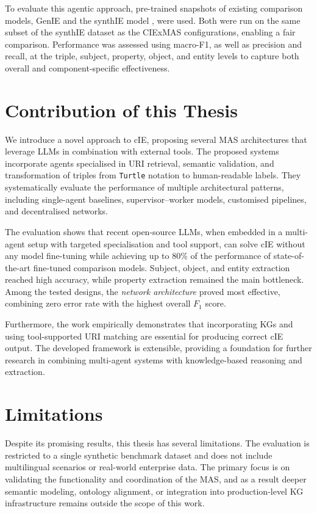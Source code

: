 \documentclass[a4paper,oneside,bibliography=totoc]{scrbook}
\begin{document}
To evaluate this agentic approach, pre-trained snapshots of existing comparison models, GenIE \cite{Josifoski2021} and the synthIE model \cite{Josifoski2023}, were used. Both were run on the same subset of the synthIE dataset as the CIExMAS configurations, enabling a fair comparison. Performance was assessed using macro-F1, as well as precision and recall, at the triple, subject, property, object, and entity levels to capture both overall and component-specific effectiveness.

\section{Contribution of this Thesis}
\label{sec:contribution}

We introduce a novel approach to \ac{cIE}, proposing several \ac{MAS} architectures that leverage \acp{LLM} in combination with external tools. The proposed systems incorporate agents specialised in \ac{URI} retrieval, semantic validation, and transformation of triples from \texttt{Turtle} notation to human-readable labels. They systematically evaluate the performance of multiple architectural patterns, including single-agent baselines, supervisor–worker models, customised pipelines, and decentralised networks.

The evaluation shows that recent open-source \acp{LLM}, when embedded in a multi-agent setup with targeted specialisation and tool support, can solve \ac{cIE} without any model fine-tuning while achieving up to 80\% of the performance of state-of-the-art fine-tuned comparison models. Subject, object, and entity extraction reached high accuracy, while property extraction remained the main bottleneck. Among the tested designs, the \textit{network architecture} proved most effective, combining zero error rate with the highest overall $F_{1}$ score.

Furthermore, the work empirically demonstrates that incorporating \acp{KG} and using tool-supported \ac{URI} matching are essential for producing correct \ac{cIE} output. The developed framework is extensible, providing a foundation for further research in combining multi-agent systems with knowledge-based reasoning and extraction.

\section{Limitations}
\label{sec:limitations}

Despite its promising results, this thesis has several limitations. The evaluation is restricted to a single synthetic benchmark dataset and does not include multilingual scenarios or real-world enterprise data. The primary focus is on validating the functionality and coordination of the \ac{MAS}, and as a result deeper semantic modeling, ontology alignment, or integration into production-level \ac{KG} infrastructure remains outside the scope of this work.
\end{document}
